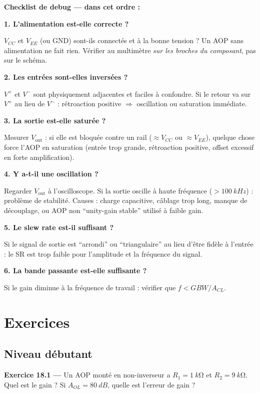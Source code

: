 \documentclass[12pt,a4paper,twoside]{book}
\begin{document}
\begin{attention}
\textbf{Checklist de debug --- dans cet ordre :}

\textbf{1. L'alimentation est-elle correcte ?}

$V_{CC}$ et $V_{EE}$ (ou GND) sont-ils connectés et à la bonne tension ? Un AOP sans alimentation ne fait rien. Vérifier au multimètre \textit{sur les broches du composant}, pas sur le schéma.

\textbf{2. Les entrées sont-elles inversées ?}

$V^+$ et $V^-$ sont physiquement adjacentes et faciles à confondre. Si le retour va sur $V^+$ au lieu de $V^-$ : rétroaction positive $\Rightarrow$ oscillation ou saturation immédiate.

\textbf{3. La sortie est-elle saturée ?}

Mesurer $V_{\text{out}}$ : si elle est bloquée contre un rail ($\approx V_{CC}$ ou $\approx V_{EE}$), quelque chose force l'AOP en saturation (entrée trop grande, rétroaction positive, offset excessif en forte amplification).

\textbf{4. Y a-t-il une oscillation ?}

Regarder $V_{\text{out}}$ à l'oscilloscope. Si la sortie oscille à haute fréquence ($> \SI{100}{kHz}$) : problème de stabilité. Causes : charge capacitive, câblage trop long, manque de découplage, ou AOP non ``unity-gain stable'' utilisé à faible gain.

\textbf{5. Le slew rate est-il suffisant ?}

Si le signal de sortie est ``arrondi'' ou ``triangulaire'' au lieu d'être fidèle à l'entrée : le SR est trop faible pour l'amplitude et la fréquence du signal.

\textbf{6. La bande passante est-elle suffisante ?}

Si le gain diminue à la fréquence de travail : vérifier que $f < GBW/A_{CL}$.
\end{attention}

\section*{Exercices}

\subsection*{Niveau débutant}

\textbf{Exercice 18.1 ---} Un AOP monté en non-inverseur a $R_1 = \SI{1}{k\ohm}$ et $R_2 = \SI{9}{k\ohm}$. Quel est le gain ? Si $A_{OL} = \SI{80}{dB}$, quelle est l'erreur de gain ?
\end{document}
